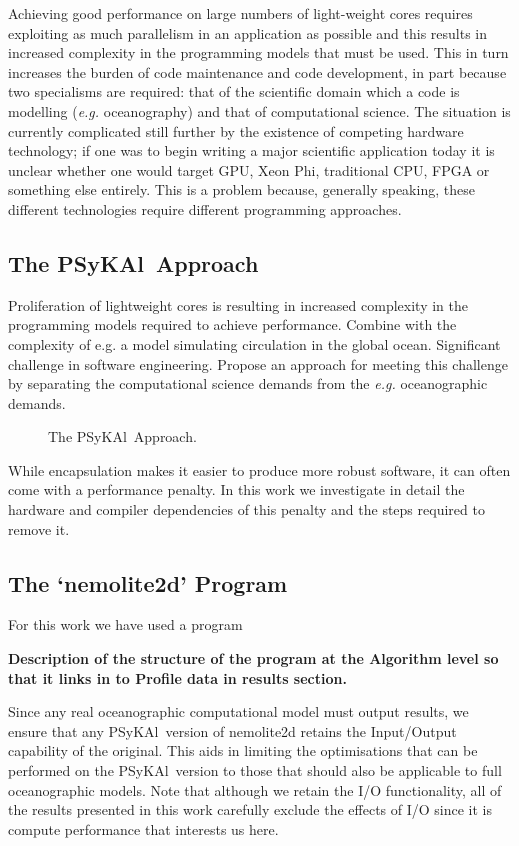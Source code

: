 \documentclass[journal]{IEEEtran}
\newcommand{\psykal}{{PS}y{KA}l\ }
\begin{document}
Achieving good performance on large numbers of light-weight cores
requires exploiting as much parallelism in an application as possible
and this results in increased complexity in the programming models
that must be used. This in turn increases the burden of code
maintenance and code development, in part because two specialisms are
required: that of the scientific domain which a code is modelling
({\it e.g.} oceanography) and that of computational science. The
situation is currently complicated still further by the existence of
competing hardware technology; if one was to begin writing a major
scientific application today it is unclear whether one would target
GPU, Xeon Phi, traditional CPU, FPGA or something else entirely. This
is a problem because, generally speaking, these different technologies
require different programming approaches.


\subsection{The \psykal Approach}
Proliferation of lightweight cores is resulting in increased
complexity in the programming models required to achieve performance.
Combine with the complexity of e.g. a model simulating circulation in
the global ocean. Significant challenge in software engineering.
Propose an approach for meeting this challenge by separating the
computational science demands from the {\it e.g.} oceanographic
demands.

\begin{figure}
\centering
\caption{The \psykal Approach.}
\end{figure}

While encapsulation makes it easier to produce more robust software,
it can often come with a performance penalty. In this work we
investigate in detail the hardware and compiler dependencies of this
penalty and the steps required to remove it.

\subsection{The `nemolite2d' Program}
For this work we have used a  program 

{\bf Description of the structure of the program at the Algorithm
  level so that it links in to Profile data in results section.}

Since any real oceanographic computational model must output results,
we ensure that any \psykal version of nemolite2d retains the Input/Output
capability of the original. This aids in limiting the optimisations
that can be performed on the \psykal version to those that should also
be applicable to full oceanographic models. Note that although we
retain the I/O functionality, all of the results presented in this work
carefully exclude the effects of I/O since it is compute performance
that interests us here.
\end{document}
